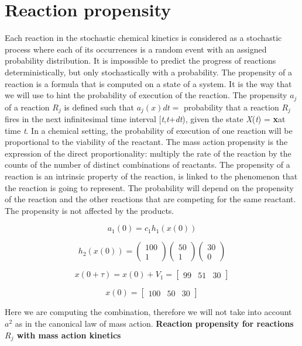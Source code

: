 \section{Reaction propensity}
Each reaction in the stochastic chemical kinetics is considered as a stochastic process where each of its occurrences is a random event with an assigned probability distribution.
It is impossible to predict the progress of reactions deterministically, but only stochastically with a probability.
The propensity of a reaction is a formula that is computed on a state of a system.
It is the way that we will use to hint the probability of execution of the reaction.
The propensity $a_j$ of a reaction $R_j$ is defined such that $a_j(x)dt=$ probability that a reaction $ R_j$ fires in the next infinitesimal time interval {[}\emph{t},\emph{t}+\emph{dt}), given the state \emph{X}(\emph{t}) = \textbf{x}at time \emph{t}.
In a chemical setting, the probability of execution of one reaction will be proportional to the viability of the reactant.
The mass action propensity is the expression of the direct proportionality: multiply the rate of the reaction by the counts of the number of distinct combinations of reactants.
The propensity of a reaction is an intrinsic property of the reaction, is linked to the phenomenon that the reaction is going to represent.
The probability will depend on the propensity of the reaction and the other reactions that are competing for the same reactant.
The propensity is not affected by the products.

$$a_1 (0) = c_1 h_1 (x(0))$$

$$h_2(x(0)) = \begin{pmatrix}100 \\ 1 \end{pmatrix}\begin{pmatrix}50 \\ 1 \end{pmatrix}\begin{pmatrix}30 \\ 0 \end{pmatrix}$$

$$x(0+ \tau) = x(0) + V_1 = \begin{bmatrix}99 &51& 30 \end{bmatrix}$$

$$x(0) = \begin{bmatrix}100 &50& 30 \end{bmatrix}$$

Here we are computing the combination, therefore we will not take into account $a^2$ as in the canonical law of mass action.
\textbf{Reaction propensity for reactions $ R_j$ with mass action kinetics}

